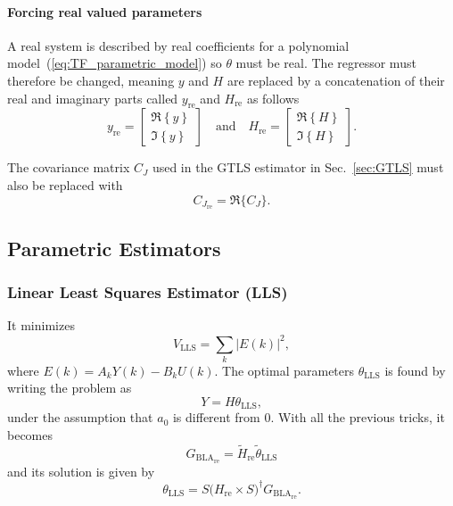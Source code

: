 \paragraph{Forcing real valued parameters} A real system is described by real coefficients for a polynomial model~(\ref{eq:TF_parametric_model}) so $\theta$ must be real. The regressor must therefore be changed, meaning $y$ and $H$ are replaced by a concatenation of their real and imaginary parts called $y_{\text{re}}$ and $H_{\text{re}}$ as follows
\begin{equation}
    y_{\text{re}} = \begin{bmatrix}
        \Re\left\{y\right\}\\
        \Im\left\{y\right\}
    \end{bmatrix} \quad \text{and} \quad H_{\text{re}} = \begin{bmatrix}
        \Re\left\{H\right\}\\
        \Im\left\{H\right\}
    \end{bmatrix}.
\end{equation}

The covariance matrix $C_J$ used in the GTLS estimator in Sec.~\ref{sec:GTLS} must also be replaced with
\begin{equation}
    C_{J_{\text{re}}} = \Re \Big\{ C_J \Big\}.
\end{equation}

\subsection{Parametric Estimators}
\subsubsection{Linear Least Squares Estimator (LLS)}

It minimizes
\begin{equation}
    V_{\text{LLS}} = \sum_{k} |E(k)|^2,
\end{equation}
where $E(k) = A_kY(k)-B_kU(k)$. The optimal parameters $\theta_{\text{LLS}}$ is found by writing the problem as
\begin{equation}
    Y = H \theta_{\text{LLS}},
\end{equation}
under the assumption that $a_0$ is different from $0$. With all the previous tricks, it becomes
\begin{equation}
    G_{\text{BLA}_{\text{re}}} = \tilde{H}_{\text{re}} \tilde{\theta}_{\text{LLS}}
\end{equation}
and its solution is given by
\begin{equation}
    \theta_{\text{LLS}} = S \Big(H_{\text{re}}\times S\Big)^\dagger G_{\text{BLA}_{\text{re}}}.
\end{equation}

